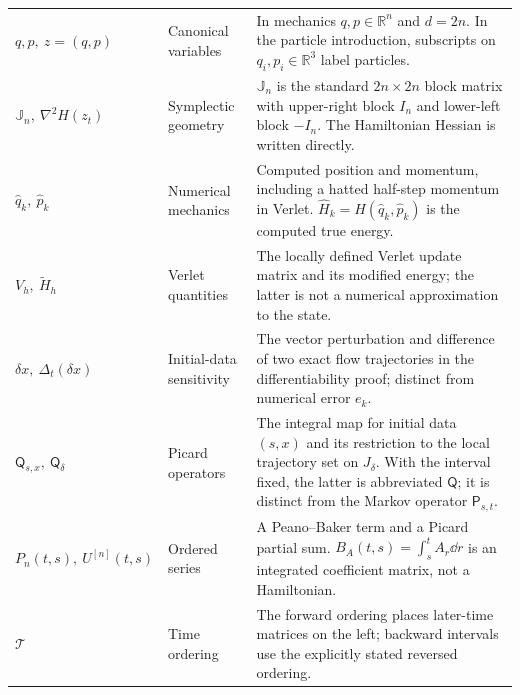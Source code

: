 \begin{longtable}{@{}>{\raggedright\arraybackslash}p{32mm}>{\raggedright\arraybackslash}p{26mm}>{\raggedright\arraybackslash}p{90mm}@{}}
$q,p,\ z=(q,p)$ & Canonical variables & In mechanics $q,p\in\mathbb R^n$ and $d=2n$. In the particle introduction, subscripts on $q_i,p_i\in\mathbb R^3$ label particles.\\[3pt]
$\mathbb J_n,\ \nabla^2H(z_t)$ & Symplectic geometry & $\mathbb J_n$ is the standard $2n\times2n$ block matrix with upper-right block $I_n$ and lower-left block $-I_n$. The Hamiltonian Hessian is written directly.\\[3pt]
$\widehat q_k,\ \widehat p_k$ & Numerical mechanics & Computed position and momentum, including a hatted half-step momentum in Verlet. $\widehat H_k=H(\widehat q_k,\widehat p_k)$ is the computed true energy.\\[3pt]
$V_h,\ \widetilde H_h$ & Verlet quantities & The locally defined Verlet update matrix and its modified energy; the latter is not a numerical approximation to the state.\\[3pt]
$\delta x,\ \Delta_t(\delta x)$ & Initial-data sensitivity & The vector perturbation and difference of two exact flow trajectories in the differentiability proof; distinct from numerical error $e_k$.\\[3pt]
$\mathsf Q_{s,x},\ \mathsf Q_\delta$ & Picard operators & The integral map for initial data $(s,x)$ and its restriction to the local trajectory set on $J_\delta$. With the interval fixed, the latter is abbreviated $\mathsf Q$; it is distinct from the Markov operator $\mathsf P_{s,t}$.\\[3pt]
$P_n(t,s),\ U^{[n]}(t,s)$ & Ordered series & A Peano--Baker term and a Picard partial sum. $B_A(t,s)=\int_s^t A_r\dd r$ is an integrated coefficient matrix, not a Hamiltonian.\\[3pt]
$\mathcal T$ & Time ordering & The forward ordering places later-time matrices on the left; backward intervals use the explicitly stated reversed ordering.\\[3pt]
\end{longtable}
\addtocounter{table}{-1}
\endgroup

